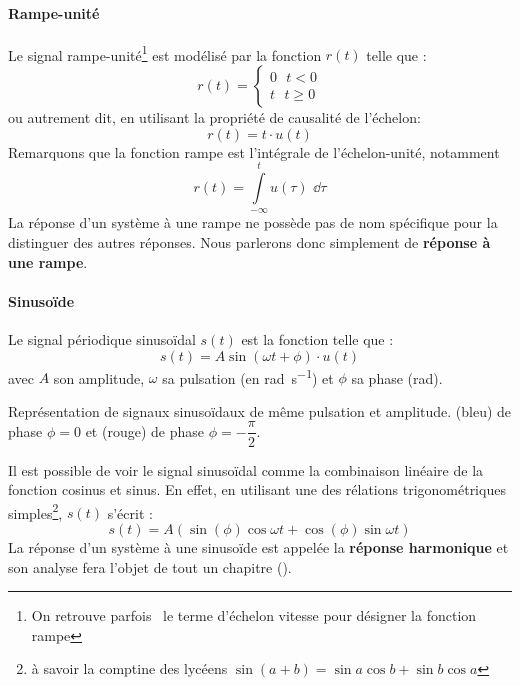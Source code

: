 \paragraph{Rampe-unité}
Le signal rampe-unité\footnote{On retrouve parfois~\cite{sueurautomatique} 
le terme d'échelon vitesse pour désigner la fonction rampe} est
modélisé par la fonction $r(t)$ telle que :
\[
    r(t)=
    \begin{cases}
	0\,\,\,\,t<0 \\
	t\,\,\,\,t\geq0 
    \end{cases}
\]
ou autrement dit, en utilisant la propriété de causalité de l'échelon:
\[
    r(t)=t\cdot u(t)
\]
Remarquons que la fonction rampe est l'intégrale de l'échelon-unité, notamment 
\begin{equation}
    r(t)=\int\limits_{-\infty}^{t} u(\tau)\,\,\dd{\tau}
    \label{eq-rampe-echelon_relation}
\end{equation}
La réponse d'un système à une rampe ne possède pas de nom spécifique 
pour la distinguer des autres réponses. Nous parlerons donc simplement 
de \textbf{réponse à une rampe}. 
\paragraph{Sinuso\"ide}
Le signal périodique sinuso\"idal $s(t)$ est la fonction telle que :
\[
    s(t)=A\sin{(\omega t +\phi)}\cdot u(t)
\]
avec $A$ son amplitude, $\omega$ sa pulsation (en \si{\radian\per\second}) 
et $\phi$ sa phase (\si{\radian}).
\begin{marginfigure}
    \centering
    \resizebox{\linewidth}{!}{}
    \caption{Représentation de signaux sinuso\"idaux de même pulsation 
             et amplitude. (bleu) de phase $\phi=0$ et 
            (rouge) de phase $\phi=-\dfrac{\pi}{2}$.\label{fig-sin}}
\end{marginfigure}
Il est possible de voir le signal sinuso\"idal comme la combinaison
linéaire de la fonction cosinus et sinus. En effet, en utilisant une 
des rélations trigonométriques simples\footnote{à savoir la comptine des 
lycéens $\sin(a+b)=\sin{a}\cos{b}+\sin{b}\cos{a}$}, $s(t)$ s'écrit :
\[
    s(t)=A(\sin(\phi)\cos{\omega t}+\cos(\phi)\sin{\omega t})
\]
La réponse d'un système à une sinuso\"ide est appelée la 
\textbf{réponse harmonique} et son analyse fera l'objet de tout 
un chapitre ().

